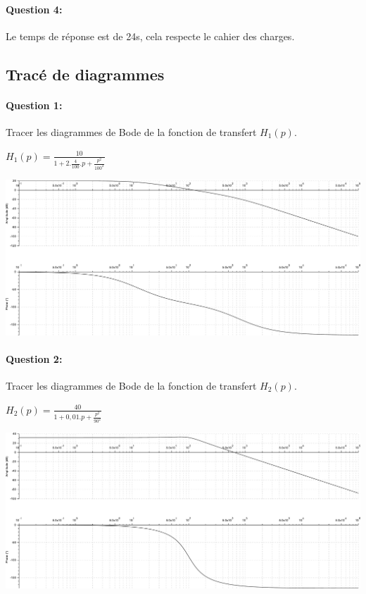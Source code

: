 \paragraph{Question 4:}

Le temps de réponse est de 24s, cela respecte le cahier des charges.

\subsection{Tracé de diagrammes}

\paragraph{Question 1:} Tracer les diagrammes de Bode de la fonction de transfert $H_1(p)$.

\begin{center}
$H_1(p)=\frac{10}{1+2.\frac{4}{100}.p+\frac{p^2}{100^2}}$
\end{center}

\begin{center}
 \includegraphics[width=0.9\linewidth]{img/BodeH1_cor}
\end{center}

\paragraph{Question 2:} Tracer les diagrammes de Bode de la fonction de transfert $H_2(p)$.

\begin{center}
$H_2(p)=\frac{40}{1+0,01.p+\frac{p^2}{90^2}}$
\end{center}

\begin{center}
 \includegraphics[width=0.9\linewidth]{img/BodeH2_cor}
\end{center}

